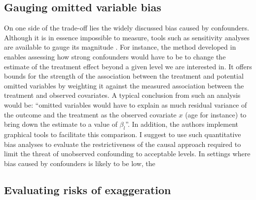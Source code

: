 \documentclass[usletter, 12pt]{article}
\begin{document}
	
		\subsection{Gauging omitted variable bias}
	
			On one side of the trade-off lies the widely discussed bias caused by confounders. Although it is in essence impossible to measure, tools such as sensitivity analyses are available to gauge its magnitude \citep{rosenbaum_observational_2002, middleton_bias_2016, oster_unobservable_2019, cinelli_making_2020}. For instance, the method developed in \cite{cinelli_making_2020} enables assessing how strong confounders would have to be to change the estimate of the treatment effect beyond a given level we are interested in. It offers bounds for the strength of the association between the treatment and potential omitted variables by weighting it against the measured association between the treatment and observed covariates. A typical conclusion from such an analysis would be: ``omitted variables would have to explain as much residual variance of the outcome and the treatment as the observed covariate $x$ (age for instance) to bring down the estimate to a value of $\beta_{l}$''. In addition, the authors implement graphical tools to facilitate this comparison. I suggest to use such quantitative bias analyses to evaluate the restrictiveness of the causal approach required to limit the threat of unobserved confounding to acceptable levels. In settings where bias caused by confounders is likely to be low, the
			
		\subsection{Evaluating risks of exaggeration}
\end{document}
